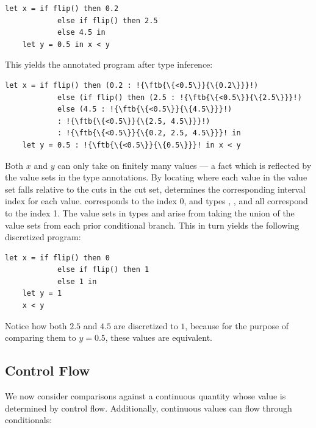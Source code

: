 \begin{lstlisting}[aboveskip=1em,belowskip=1em,escapechar=!,gobble=4]
    let x = if flip() then 0.2
            else if flip() then 2.5
            else 4.5 in
    let y = 0.5 in x < y
\end{lstlisting}

This yields the annotated program after type inference:

\begin{lstlisting}[aboveskip=1em,belowskip=1em,escapechar=!,gobble=4]
    let x = if flip() then (0.2 : !{\ftb{\{<0.5\}}{\{0.2\}}}!)
            else (if flip() then (2.5 : !{\ftb{\{<0.5\}}{\{2.5\}}}!)
            else (4.5 : !{\ftb{\{<0.5\}}{\{4.5\}}}!)
            : !{\ftb{\{<0.5\}}{\{2.5, 4.5\}}}!)
            : !{\ftb{\{<0.5\}}{\{0.2, 2.5, 4.5\}}}! in
    let y = 0.5 : !{\ftb{\{<0.5\}}{\{0.5\}}}! in x < y
\end{lstlisting}

Both $x$ and $y$ can only take on finitely many values --- a fact which is reflected by the value sets in the type annotations. By locating where each value in the value set falls relative to the cuts in the cut set, \Slice{} determines the corresponding interval index for each value.  corresponds to the index 0, and types , , and  all correspond to the index 1. The value sets in types  and  arise from taking the union of the value sets from each prior conditional branch. This in turn yields the following discretized program:

\begin{lstlisting}[aboveskip=1em,belowskip=1em,gobble=4]
    let x = if flip() then 0
            else if flip() then 1
            else 1 in
    let y = 1
    x < y
\end{lstlisting}

Notice how both $2.5$ and $4.5$ are discretized to $1$, because for the purpose of comparing them to $y = 0.5$, these values are equivalent.

\fi
\subsection{Control Flow}\label{sec:examples:4}

We now consider comparisons against a continuous quantity whose value is determined by control flow. Additionally, continuous values can flow through conditionals:


